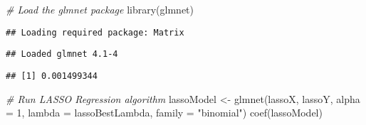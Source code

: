 \documentclass[
]{article}
\newenvironment{Shaded}{\begin{snugshade}}{\end{snugshade}}
\newcommand{\AttributeTok}[1]{\textcolor[rgb]{0.77,0.63,0.00}{#1}}
\newcommand{\CommentTok}[1]{\textcolor[rgb]{0.56,0.35,0.01}{\textit{#1}}}
\newcommand{\DecValTok}[1]{\textcolor[rgb]{0.00,0.00,0.81}{#1}}
\newcommand{\FunctionTok}[1]{\textcolor[rgb]{0.00,0.00,0.00}{#1}}
\newcommand{\NormalTok}[1]{#1}
\newcommand{\OtherTok}[1]{\textcolor[rgb]{0.56,0.35,0.01}{#1}}
\newcommand{\SpecialCharTok}[1]{\textcolor[rgb]{0.00,0.00,0.00}{#1}}
\newcommand{\StringTok}[1]{\textcolor[rgb]{0.31,0.60,0.02}{#1}}
\begin{document}
\begin{Shaded}
\begin{Highlighting}[]
\CommentTok{\# Load the glmnet package}
\FunctionTok{library}\NormalTok{(glmnet)}
\end{Highlighting}
\end{Shaded}

\begin{verbatim}
## Loading required package: Matrix
\end{verbatim}

\begin{verbatim}
## Loaded glmnet 4.1-4
\end{verbatim}

\begin{Shaded}
\end{Shaded}

\begin{verbatim}
## [1] 0.001499344
\end{verbatim}

\begin{Shaded}
\begin{Highlighting}[]
\CommentTok{\# Run LASSO Regression algorithm}
\NormalTok{lassoModel }\OtherTok{\textless{}{-}} \FunctionTok{glmnet}\NormalTok{(lassoX, lassoY, }\AttributeTok{alpha =} \DecValTok{1}\NormalTok{, }\AttributeTok{lambda =}\NormalTok{ lassoBestLambda, }
    \AttributeTok{family =} \StringTok{"binomial"}\NormalTok{)}
\FunctionTok{coef}\NormalTok{(lassoModel)}
\end{Highlighting}
\end{Shaded}
\end{document}
